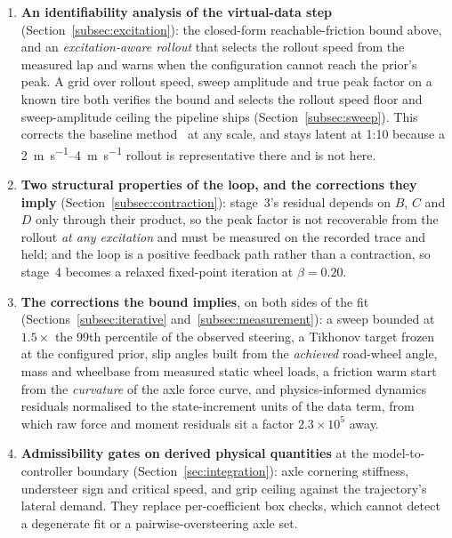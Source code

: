 \begin{enumerate}
\item \textbf{An identifiability analysis of the virtual-data step}
(Section~\ref{subsec:excitation}): the closed-form reachable-friction bound
above, and an \emph{excitation-aware rollout} that selects the rollout speed
from the measured lap and warns when the configuration cannot reach the prior's
peak. A grid over rollout speed, sweep amplitude and true peak factor on a known
tire both verifies the bound and selects the rollout speed floor and sweep-amplitude
ceiling the pipeline ships (Section~\ref{subsec:sweep}). This corrects the baseline
method~\cite{ontrack2025} at any scale, and stays latent at 1:10 because a
\SIrange{2}{4}{\meter\per\second} rollout is representative there and is not
here.

\item \textbf{Two structural properties of the loop, and the corrections they
imply} (Section~\ref{subsec:contraction}): stage~3's residual depends on $B$,
$C$ and $D$ only through their product, so the peak factor is not recoverable
from the rollout \emph{at any excitation} and must be measured on the recorded
trace and held; and the loop is a positive feedback path rather than a
contraction, so stage~4 becomes a relaxed fixed-point iteration at
$\beta=\num{0.20}$.

\item \textbf{The corrections the bound implies}, on both sides of the fit
(Sections~\ref{subsec:iterative} and~\ref{subsec:measurement}): a sweep bounded
at $1.5\times$ the 99th percentile of the observed steering, a Tikhonov target
frozen at the configured prior, slip angles built from the \emph{achieved}
road-wheel angle, mass and wheelbase from measured static wheel loads, a
friction warm start from the \emph{curvature} of the axle force curve, and
physics-informed dynamics residuals normalised to the state-increment units of
the data term, from which raw force and moment residuals sit a factor
$\num{2.3}\times10^{5}$ away.

\item \textbf{Admissibility gates on derived physical quantities} at the
model-to-controller boundary (Section~\ref{sec:integration}): axle cornering
stiffness, understeer sign and critical speed, and grip ceiling against the
trajectory's lateral demand. They replace per-coefficient box checks, which
cannot detect a degenerate fit or a pairwise-oversteering axle set.


\end{enumerate}
